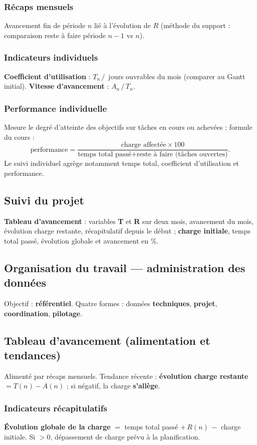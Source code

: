 \documentclass[11pt,a4paper]{article}
\begin{document}
\subsubsection{Récaps mensuels}
Avancement fin de période $n$ lié à l'évolution de $R$ (méthode du support : comparaison reste à faire période $n-1$ vs $n$).

\subsubsection{Indicateurs individuels}
\textbf{Coefficient d'utilisation} : $T_n\,/\,$ jours ouvrables du mois (comparer au Gantt initial). \textbf{Vitesse d'avancement} : $A_n\,/\,T_n$.

\subsubsection{Performance individuelle}
Mesure le degré d'atteinte des objectifs sur tâches en cours ou achevées ; formule du cours : \[\text{performance} = \frac{\text{charge affectée} \times 100}{\text{temps total passé} + \text{reste à faire (tâches ouvertes)}}.\]
Le suivi individuel agrège notamment temps total, coefficient d'utilisation et performance.

\subsection{Suivi du projet}
\textbf{Tableau d'avancement} : variables \textbf{T} et \textbf{R} sur deux mois, avancement du mois, évolution charge restante, récapitulatif depuis le début ; \textbf{charge initiale}, temps total passé, évolution globale et avancement en \%.

\subsection{Organisation du travail — administration des données}
Objectif : \textbf{référentiel}. Quatre formes : données \textbf{techniques}, \textbf{projet}, \textbf{coordination}, \textbf{pilotage}.

\subsection{Tableau d'avancement (alimentation et tendances)}
Alimenté par récaps mensuels. Tendance récente : \textbf{évolution charge restante} $= T(n) - A(n)$ ; si négatif, la charge \textbf{s'allège}.

\subsubsection{Indicateurs récapitulatifs}
\textbf{Évolution globale de la charge} $=$ temps total passé $+\, R(n)\,-$ charge initiale. Si $>0$, dépassement de charge prévu à la planification.
\end{document}
